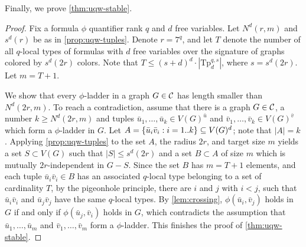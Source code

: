 Finally, we prove \cref{thm:uqw-stable}. 
\begin{proof}  

Fix a formula  $\phi$ quantifier rank $q$ and $d$ free variables.
Let $N^d(r,m)$ and $s^d(r)$ be as in \cref{prop:uqw-tuples}.
Denote $r=  7^q$, 
and let $T$ denote the number of all $q$-local types of 
formulas with $d$ free variables over the signature of  graphs colored by $s^d(2r)$ colors. Note that $T\le (s+d)^d\cdot |\mathrm{Tp}_d^{q,s}|$, where $s=s^d(2r)$.
Let $m=T+1$. 

We show that 
every $\phi$-ladder in a graph $G\in\cal C$ has length smaller than $N^d(2r,m)$. 
To reach a contradiction, assume that there is a graph $G\in\cal C$, a number $k\ge N^d(2r,m)$
and tuples $\bar u_1,\ldots,\bar u_k\in V(G)^{\bar u}$ and $\bar v_1,\ldots,\bar v_k\in V(G)^{\bar v}$
which form a $\phi$-ladder in $G$.
	Let $A=\set{\bar u_i\bar v_i: i=1..k}\subset V(G)^d$; note that $|A|=k$.
Applying \cref{prop:uqw-tuples} to the set $A$, the radius $2r$, and target size $m$
		 yields a set $S\subset V(G)$ such that $|S|\le s^d(2r)$
	and a set $B\subset A$ of size $m$ which is mutually $2r$-independent in $G-S$.
%
%
%
Since the set $B$ has $m=T+1$ elements,
and each tuple $\bar u_i\bar v_i\in B$ has an associated $q$-local type 
belonging to a set of cardinality $T$, 
by the pigeonhole principle, there are $i$ and $j$ 
with $i<j$, such that $\bar u_i\bar v_i$ and $\bar u_j\bar v_j$ 
 have the same $q$-local types. By \cref{lem:crossing},   $\phi(\bar u_i,\bar v_j)$ holds in $G$
 if and only if $\phi(\bar u_j,\bar v_i)$ holds in $G$, which contradicts the assumption that $\bar u_1,\ldots,\bar u_m$ and $\bar v_1,\ldots,\bar v_m$ form a $\phi$-ladder.
 This finishes the proof of \cref{thm:uqw-stable}.
\end{proof}


